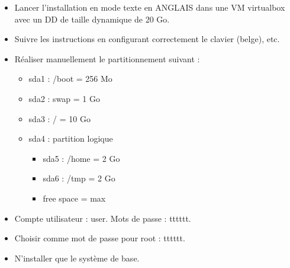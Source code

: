 \documentclass[a4paper]{article}
\begin{document}
\begin{itemize}

\item Lancer l'installation en mode texte en ANGLAIS dans une VM virtualbox avec un DD de taille dynamique de 20 Go.

\item Suivre les instructions en configurant correctement le clavier (belge), etc.

\item Réaliser manuellement le partitionnement suivant :
\begin{itemize}
    \item sda1 : /boot = 256 Mo
    \item sda2 : swap = 1 Go
    \item sda3 : / = 10 Go
    \item sda4 : partition logique
    \begin{itemize}
        \item sda5 : /home = 2 Go
        \item sda6 : /tmp = 2 Go
        \item free space = max
    \end{itemize}
\end{itemize}

\item Compte utilisateur : user. Mots de passe : tttttt.

\item Choisir comme mot de passe pour root : tttttt.

\item N'installer que le système de base.


\end{itemize}
\end{document}
